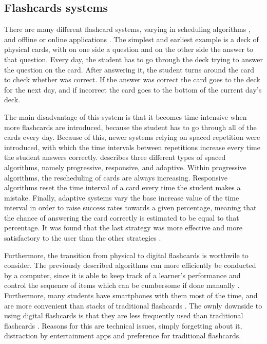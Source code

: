
\subsection{Flashcards systems}

There are many different flashcard systems, varying in scheduling algorithms \cite{microlearning}, and offline or online applications \cite{nakata}. The simplest and earliest example is a deck of physical cards, with on one side a question and on the other side the answer to that question. Every day, the student has to go through the deck trying to answer the question on the card. After answering it, the student turns around the card to check whether was correct. If the answer was correct the card goes to the deck for the next day, and if incorrect the card goes to the bottom of the current day's deck.

The main disadvantage of this system is that it becomes time-intensive when more flashcards are introduced, because the student has to go through all of the cards every day. Because of this, newer systems relying on spaced repetition were introduced, with which the time intervals between repetitions increase every time the student answers correctly.  describes three different types of spaced algorithms, namely progressive, responsive, and adaptive. Within progressive algorithms, the rescheduling of cards are always increasing. Responsive algorithms reset the time interval of a card every time the student makes a mistake. Finally, adaptive systems vary the base increase value of the time interval in order to raise success rates towards a given percentage, meaning that the chance of answering the card correctly is estimated to be equal to that percentage. It was found that the last strategy was more effective and more satisfactory to the user than the other strategies \cite{microlearning}.

Furthermore, the transition from physical to digital flashcards is worthwile to consider. The previously described algorithms can more efficiently be conducted by a computer, since it is able to keep track of a learner's performance and control the sequence of items which can be cumbersome if done manually \cite{nakata}. Furthermore, many students have smartphones with them most of the time, and are more convenient than stacks of traditional flashcards \cite{nakata}. The ownly downside to using digital flashcards is that they are less frequently used than traditional flashcards \cite{burgess}. Reasons for this are technical issues, simply forgetting about it, distraction by entertainment apps and preference for traditional flashcards.

